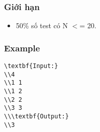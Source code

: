 \subsubsection{   Giới hạn  }
\begin{itemize}
	\item     50\% số test có N $<$= 20.   
\end{itemize}

\subsubsection{   Example  }
\begin{verbatim}
\textbf{Input:}
\\4
\\1 1
\\1 2
\\2 2
\\3 3
\\\textbf{Output:}
\\3\end{verbatim}